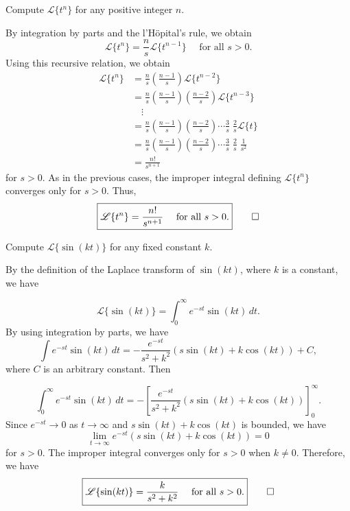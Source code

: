 \begin{example}
	Compute $\mathscr{L}\{t^n\} $ for any positive integer $n.$
\end{example}
\begin{solution}
	By integration by parts and the l'H\"opital's rule, we obtain
	\[\mathscr{L} \{t^n\} = \frac{n}{s}{\mathscr{L} \{t^{n-1}\}}\quad \text{ for all } s>0.\]
	Using this recursive relation, we obtain
	\[\begin{split}
		\mathscr{L} \{t^n\} &= \frac{n}{s}\left(\frac{n-1}{s}\right){\mathscr{L} \{t^{n-2}\}}\\
		&= \frac{n}{s}\left(\frac{n-1}{s}\right)\left(\frac{n-2}{s}\right){\mathscr{L} \{t^{n-3}\}}\\
		&\quad \vdots\\
			&= \frac{n}{s}\left(\frac{n-1}{s}\right)\left(\frac{n-2}{s}\right)\cdots \frac{3}{s}\; \frac{2}{s}{\mathscr{L} \{t\}}\\
			&=\frac{n}{s}\left(\frac{n-1}{s}\right)\left(\frac{n-2}{s}\right)\cdots \frac{3}{s}\; \frac{2}{s}\;\frac{1}{s^2}\\
			&=\frac{n!}{s^{n+1}}
	\end{split}
	\]
	for $s>0$.  As in the previous cases, the improper integral defining \(\mathscr{L}\{t^n\}\) converges only for $s>0.$ Thus, 
	\[\boxed{\mathscr{L} \{t^n\} = \frac{n!}{s^{n+1}}\quad \text{ for all } s>0.}\qedhere\]
\end{solution}

\begin{example}
	Compute $\mathscr{L}\{\sin(kt)\}$ for any fixed constant $k.$
\end{example}
\begin{solution}

	By the definition of  the Laplace transform of \( \sin(kt) \), where \( k \) is a constant, we have
	
	\[
	\mathscr{L}\{\sin(kt)\} = \int_0^\infty e^{-st} \sin(kt) \, dt.
	\]
By using integration by parts,  we have 
\[
\int e^{-st} \sin(kt) \, dt = -\frac{e^{-st}}{s^2 + k^2}\left(s \sin(kt) + k \cos(kt)\right)   + C,
\]
where $C$ is an arbitrary constant.
Then 

\[
\int_0^\infty e^{-st} \sin(kt) \, dt =-\left[\frac{e^{-st}}{s^2 + k^2}\left(s \sin(kt) + k \cos(kt)\right) \right]_0^\infty.
\]
Since $e^{-st} \to 0$  as $t\to\infty$ and $s \sin(kt) + k \cos(kt)$ is bounded, we have
\[
\lim_{t \to \infty} e^{-st}\left( s \sin(kt) + k \cos(kt) \right)  = 0\] for $s>0.$ The improper integral converges only for $s>0$ when $k\ne 0.$
Therefore, we have
\[
\boxed{\mathscr{L}\{\sin(kt)\} = \frac{k}{s^2 + k^2} \quad \text{ for all } s>0.}\qedhere
\]
\end{solution}



